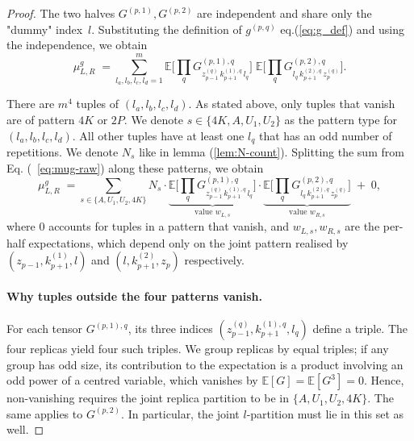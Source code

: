 \documentclass[12pt,a4paper]{article}
\begin{document}
\begin{proof}
The two halves $G^{(p,1)},G^{(p,2)}$ are independent and share only the
"dummy" index~$l$. Substituting the definition of $g^{(p,q)}$ eq.(\eqref{eq:g_def}) and using the independence, we obtain
\begin{equation}\label{eq:mug-raw}
\mu^{g}_{L,R}\;=\!\!\sum_{l_{a},l_{b},l_{c},l_{d}=1}^{m}\!\!
\mathbb{E}\!\Big[\prod_{q}G^{(p,1),q}_{z_{p-1}^{(q)}\,k^{(1),q}_{p+1}\,l_{q}}\Big]\;
\mathbb{E}\!\Big[\prod_{q}G^{(p,2),q}_{l_{q}\,k^{(2),q}_{p+1}\,z_{p}^{(q)}}\Big].
\end{equation}

There are $m^{4}$ tuples of $(l_{a},l_{b},l_{c},l_{d})$. As stated above, only tuples that vanish are of pattern $4K$  or $2P$. 
We denote $s\in\{4K, A, U_1,U_2\}$ as the pattern type for $(l_{a},l_{b},l_{c},l_{d})$. All other tuples have at least one $l_{q}$  that has an odd number of repetitions. We denote $N_s$  like in lemma (\ref{lem:N-count}).
Splitting the sum from Eq.  (~\eqref{eq:mug-raw}) along these patterns, we obtain
\begin{equation}\label{eq:mug-split}
\mu^{g}_{L,R}\;=\!\!\sum_{s\in\{A,U_{1},U_{2},4K\}}\!\!
N_{s}\cdot
\underbrace{\mathbb{E}\!\Big[\prod_{q}G^{(p,1),q}_{z_{p-1}^{(q)}\,k^{(1),q}_{p+1}\,l_{q}}\Big]}_{\text{value }w_{L,s}}
\cdot
\underbrace{\mathbb{E}\!\Big[\prod_{q}G^{(p,2),q}_{l_{q}\,k^{(2),q}_{p+1}\,z_{p}^{(q)}}\Big]}_{\text{value }w_{R,s}}
\;+\;0,
\end{equation}
where  $0$ accounts for tuples in a pattern that vanish, and $w_{L,s}, w_{R,s}$ are the per-half expectations, which depend only on the joint pattern realised by $(z_{p-1},k^{(1)}_{p+1},l)$ and
$(l,k^{(2)}_{p+1},z_{p})$ respectively.

\paragraph{Why tuples outside the four patterns vanish.}
For each tensor $G^{(p,1),q}$, its three indices
$(z_{p-1}^{(q)},k^{(1),q}_{p+1},l_{q})$ define a triple. The four
replicas yield four such triples. We group replicas by equal triples; if
any group has odd size, its contribution to the expectation is a product
involving an odd power of a centred variable, which vanishes by
$\mathbb{E}[G]=\mathbb{E}[G^{3}]=0$. Hence, non-vanishing requires the
joint replica partition to be in $\{A,U_{1},U_{2},4K\}$. The same
applies to $G^{(p,2)}$. In particular, the joint $l$-partition must lie
in this set as well.


\end{proof}
\end{document}

